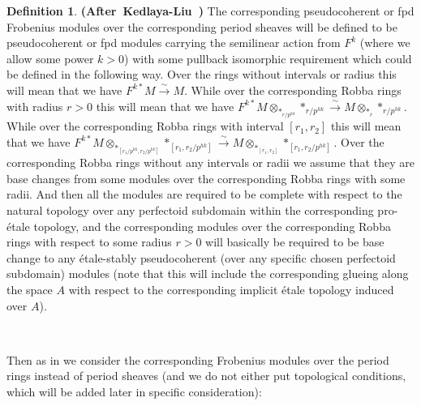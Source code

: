 \documentclass[12pt]{amsart}
\theoremstyle{definition}
\newtheorem{definition}[theorem]{Definition}
\numberwithin{equation}{section}
\begin{document}
\begin{definition} \mbox{\bf{(After Kedlaya-Liu \cite[Definition 4.4.4]{KL2})}} The corresponding pseudocoherent or fpd Frobenius modules over the corresponding period sheaves will be defined to be pseudocoherent or fpd modules carrying the semilinear action from $F^k$ (where we allow some power $k>0$) with some pullback isomorphic requirement which could be defined in the following way. Over the rings without intervals or radius this will mean that we have $F^{k*}M\overset{\sim}{\rightarrow}M$. While over the corresponding Robba rings with radius $r>0$ this will mean that we have $F^{k*}M\otimes_{*_{r/p^{hk}}} *_{r/p^{hk}}\overset{\sim}{\rightarrow}M\otimes_{*_r}*_{r/p^{hk}}$. While over the corresponding Robba rings with interval $[r_1,r_2]$ this will mean that we have $F^{k*}M\otimes_{*_{[r_1/p^{hk},r_2/p^{hk}]}} *_{[r_1,r_2/p^{hk}]}\overset{\sim}{\rightarrow}M\otimes_{*_{[r_1,r_2]}}*_{[r_1,r_2/p^{hk}]}$. Over the corresponding Robba rings without any intervals or radii we assume that they are base changes from some modules over the corresponding Robba rings with some radii. And then all the modules are required to be complete with respect to the natural topology over any perfectoid subdomain within the corresponding pro-\'etale topology, and the corresponding modules over the corresponding Robba rings with respect to some radius $r>0$ will basically be required to be base change to any \'etale-stably pseudocoherent (over any specific chosen perfectoid subdomain) modules (note that this will include the corresponding glueing along the space $A$ with respect to the corresponding implicit \'etale topology induced over $A$). 
	
\end{definition}

\


\indent Then as in \cite[Definition 4.4.4]{KL2} we consider the corresponding Frobenius modules over the period rings instead of period sheaves (and we do not either put topological conditions, which will be added later in specific consideration):



\end{document}
